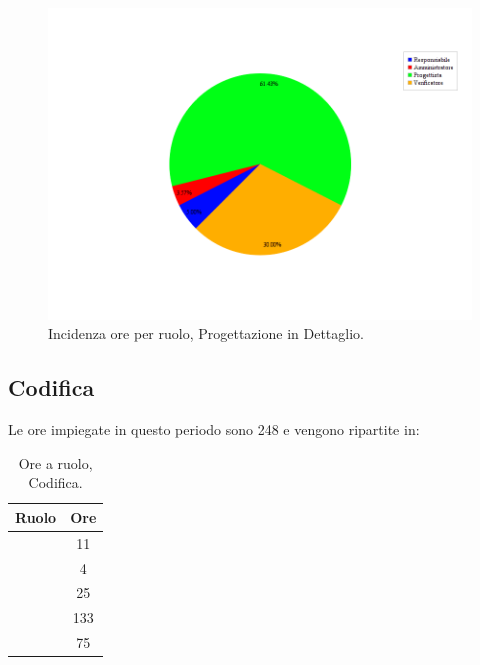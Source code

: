 \begin{figure}[H]
	\centering
	\includegraphics[scale=0.5]{immagini/Grafi/OreRuoloPD}
	\caption{Incidenza ore per ruolo, Progettazione in Dettaglio.}
\end{figure}

\subsection{Codifica}
Le ore impiegate in questo periodo sono 248 e vengono ripartite in:
\begin{table}[H]
	\begin{center}
		\begin{tabular}{|c|c|}
			\hline
			\textbf{Ruolo}	& \textbf{Ore} \\
			\hline
			\Res	&	11	\\
			\hline
			\Amm	&	4	\\
			\hline
			\Prog		&	25	\\
			\hline
			\Progr	&	133	\\
			\hline
			\Ver	&	75	\\
			\hline
		\end{tabular}
	\end{center}
	\caption{Ore a ruolo, Codifica.}
\end{table}

